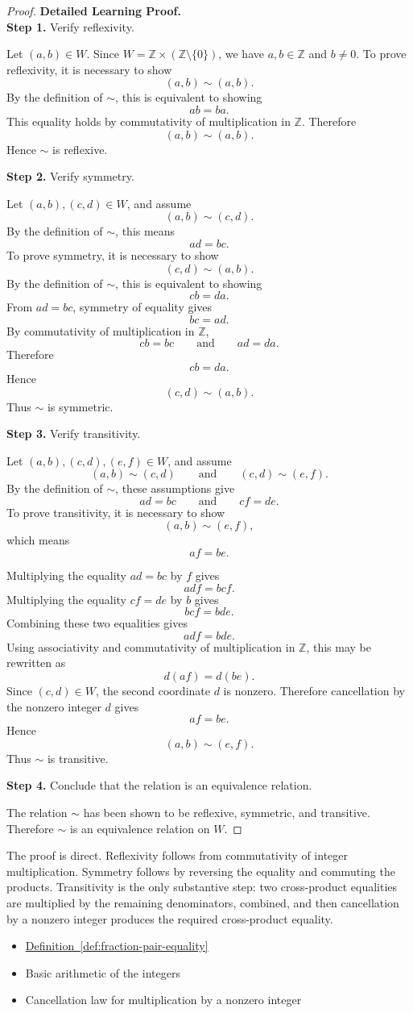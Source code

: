 \begin{proof}
\textbf{Detailed Learning Proof.}~\\

\textbf{Step 1.} Verify reflexivity.

Let $(a,b)\in W$. Since $W=\mathbb{Z}\times(\mathbb{Z}\setminus\{0\})$,
we have $a,b\in\mathbb{Z}$ and $b\neq 0$. To prove reflexivity, it is
necessary to show
\[
(a,b)\sim(a,b).
\]
By the definition of $\sim$, this is equivalent to showing
\[
ab=ba.
\]
This equality holds by commutativity of multiplication in $\mathbb{Z}$.
Therefore
\[
(a,b)\sim(a,b).
\]
Hence $\sim$ is reflexive.

\textbf{Step 2.} Verify symmetry.

Let $(a,b),(c,d)\in W$, and assume
\[
(a,b)\sim(c,d).
\]
By the definition of $\sim$, this means
\[
ad=bc.
\]
To prove symmetry, it is necessary to show
\[
(c,d)\sim(a,b).
\]
By the definition of $\sim$, this is equivalent to showing
\[
cb=da.
\]
From $ad=bc$, symmetry of equality gives
\[
bc=ad.
\]
By commutativity of multiplication in $\mathbb{Z}$,
\[
cb=bc
\qquad\text{and}\qquad
ad=da.
\]
Therefore
\[
cb=da.
\]
Hence
\[
(c,d)\sim(a,b).
\]
Thus $\sim$ is symmetric.

\textbf{Step 3.} Verify transitivity.

Let $(a,b),(c,d),(e,f)\in W$, and assume
\[
(a,b)\sim(c,d)
\qquad\text{and}\qquad
(c,d)\sim(e,f).
\]
By the definition of $\sim$, these assumptions give
\[
ad=bc
\qquad\text{and}\qquad
cf=de.
\]
To prove transitivity, it is necessary to show
\[
(a,b)\sim(e,f),
\]
which means
\[
af=be.
\]

Multiplying the equality $ad=bc$ by $f$ gives
\[
adf=bcf.
\]
Multiplying the equality $cf=de$ by $b$ gives
\[
bcf=bde.
\]
Combining these two equalities gives
\[
adf=bde.
\]
Using associativity and commutativity of multiplication in $\mathbb{Z}$,
this may be rewritten as
\[
d(af)=d(be).
\]
Since $(c,d)\in W$, the second coordinate $d$ is nonzero. Therefore
cancellation by the nonzero integer $d$ gives
\[
af=be.
\]
Hence
\[
(a,b)\sim(e,f).
\]
Thus $\sim$ is transitive.

\textbf{Step 4.} Conclude that the relation is an equivalence relation.

The relation $\sim$ has been shown to be reflexive, symmetric, and
transitive. Therefore $\sim$ is an equivalence relation on $W$.
\end{proof}

\begin{remark*}
The proof is direct. Reflexivity follows from commutativity of integer
multiplication. Symmetry follows by reversing the equality and commuting
the products. Transitivity is the only substantive step: two cross-product
equalities are multiplied by the remaining denominators, combined, and
then cancellation by a nonzero integer produces the required cross-product
equality.
\end{remark*}

\begin{dependencies}
\begin{itemize}
  \item \hyperref[def:fraction-pair-equality]{Definition~\ref*{def:fraction-pair-equality}}
  \item Basic arithmetic of the integers
  \item Cancellation law for multiplication by a nonzero integer
\end{itemize}
\end{dependencies}

